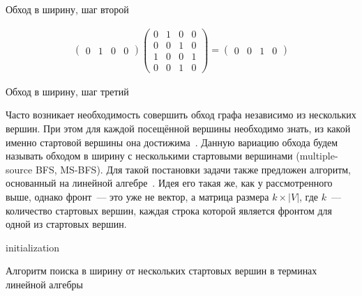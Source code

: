 \begin{example}
\begin{marginfigure}
    \begin{center}
        \resizebox{\marginparwidth}{!}{}
    \end{center}
    \caption{Обход в ширину, шаг второй}
    \label{fig:bfs_step_2}
\end{marginfigure}

\begin{align*}
    \begin{pmatrix}
        0 & 1 & 0 & 0
    \end{pmatrix}
    \begin{pmatrix}
        0 & 1 & 0 & 0 \\
        0 & 0 & 1 & 0 \\
        1 & 0 & 0 & 1 \\
        0 & 0 & 1 & 0
    \end{pmatrix} =
    \begin{pmatrix}
        0 & 0 & 1 & 0
    \end{pmatrix}
\end{align*}

\begin{marginfigure}
    \begin{center}
        \resizebox{\marginparwidth}{!}{}
    \end{center}
    \caption{Обход в ширину, шаг третий}
    \label{fig:bfs_step_3}
\end{marginfigure}

\end{example}


Часто возникает необходимость совершить обход графа независимо из нескольких вершин.
При этом для каждой посещённой вершины необходимо знать, из какой именно стартовой вершины она достижима~.
Данную вариацию обхода будем называть обходом в ширину с несколькими стартовыми вершинами (multiple-source BFS, MS-BFS). 
Для такой постановки задачи также предложен алгоритм, основанный на линейной алгебре~.
Идея его такая же, как у рассмотренного выше, однако фронт~--- это уже не вектор, а матрица размера $k \times |V|$, где $k$~--- количество стартовых вершин, каждая строка которой является фронтом для одной из стартовых вершин.

\begin{algorithm}
    \SetAlgoLined
    initialization\;
    \caption{Алгоритм поиска в ширину от нескольких стартовых вершин в терминах линейной алгебры}
    \label{algo:MS-BFS_linal}
\end{algorithm}

